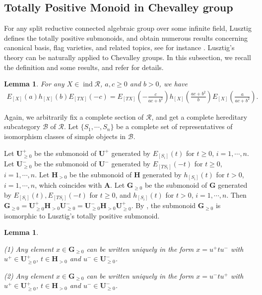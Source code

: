 \documentclass[12pt]{amsart}
\newtheorem{lemma}[theorem]{Lemma}
\begin{document}
\subsection{Totally Positive Monoid in Chevalley group}
For any split reductive connected algebraic group over some infinite field, Lusztig defines the totally positive submonoids, and obtain numerous results concerning canonical basis, flag varieties, and related topics, see for instance \cite{TR1,TC,TR2}.
Lusztig's theory can be naturally applied to Chevalley groups.
In this subsection, we recall the definition and some results, and refer \cite{notes3} for details.

\begin{lemma}\cite[Lemma 3.1]{notes3} \label{xhy=yhx}
    For any $X\in \operatorname{ind}\mathcal{R}$, $a,c\geq 0$ and $b>0$, we have
    \begin{align*}
        E_{[X]}(a) h_{[X]}(b) E_{[TX]}(-c) = E_{[TX]}(-\frac{c}{ac+b^2}) h_{[X]}(\frac{ac+b^2}{b}) E_{[X]}(\frac{a}{ac+b^2}).
    \end{align*}
\end{lemma}

Again, we arbitrarily fix a complete section of $\mathcal{R}$, and get a complete hereditary subcategory $\mathcal{B}$ of $\mathcal{R}$.
Let $\{S_1,\cdots,S_n\}$ be a complete set of representatives of isomorphism classes of simple objects in $\mathcal{B}$.

Let $\mathbf{U}^+_{\geq 0}$ be the submonoid of $\mathbf{U}^+$ generated by $E_{[S_i]}(t)$ for $t\geq 0$, $i=1,\cdots,n$.
Let $\mathbf{U}^-_{\geq 0}$ be the submonoid of $\mathbf{U}^-$ generated by $E_{[TS_i]}(-t)$ for $t\geq 0$, $i=1,\cdots,n$.
Let $\mathbf{H}_{>0}$ be the submonoid of $\mathbf{H}$ generated by $h_{[S_i]}(t)$ for $t>0$, $i=1,\cdots,n$, which coincides with $\mathbf{A}$.
Let $\mathbf{G}_{\geq 0}$ be the submonoid of $\mathbf{G}$ generated by $E_{[S_i]}(t), E_{[TS_i]}(-t)$ for $t\geq 0$, and $h_{[S_i]}(t)$ for $t>0$, $i=1,\cdots,n$.
Then $\mathbf{G}_{\geq 0}=\mathbf{U}^+_{\geq 0}\mathbf{H}_{>0}\mathbf{U}^-_{\geq 0}=\mathbf{U}^-_{\geq 0}\mathbf{H}_{>0}\mathbf{U}^+_{\geq 0}$.
By \cite[Proposition 3.3]{notes3}, the submonoid $\mathbf{G}_{\geq 0}$ is isomorphic to Lusztig's totally positive submonoid.

\begin{lemma}\label{utu}
    \cite[Lemma 2.3]{TR1}

    (1) Any element $x\in \mathbf{G}_{\geq 0}$ can be written uniquely in the form $x=u^+ t u^-$ with $u^+\in \mathbf{U}^+_{\geq 0}$, $t\in \mathbf{H}_{>0}$ and $u^-\in \mathbf{U}^-_{\geq 0}$.

    (2) Any element $x\in \mathbf{G}_{\geq 0}$ can be written uniquely in the form $x=u^- t u^+$ with $u^+\in \mathbf{U}^+_{\geq 0}$, $t\in \mathbf{H}_{>0}$ and $u^-\in \mathbf{U}^-_{\geq 0}$.
\end{lemma}
\end{document}
